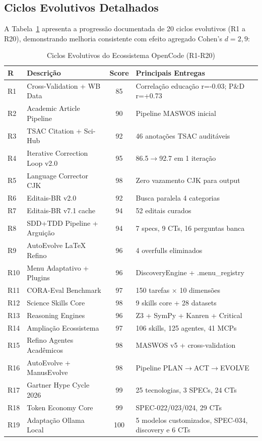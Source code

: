\subsection{Ciclos Evolutivos Detalhados}

A Tabela~\ref{tab:ciclos-evolutivos} apresenta a progressão documentada de 20 ciclos evolutivos (R1 a R20), demonstrando melhoria consistente com efeito agregado Cohen's $d = 2,9$:

\begin{table}[H]
\centering
\caption{Ciclos Evolutivos do Ecossistema OpenCode (R1-R20)}
\label{tab:ciclos-evolutivos}
\begin{tabular}{p{0.6cm}p{3.5cm}cp{5cm}}
\toprule
\textbf{R} & \textbf{Descrição} & \textbf{Score} & \textbf{Principais Entregas} \\
\midrule
R1 & Cross-Validation + WB Data & 85 & Correlação educação r=-0.03; P\&D r=+0.73 \\
R2 & Academic Article Pipeline & 90 & Pipeline MASWOS inicial \\
R3 & TSAC Citation + Sci-Hub & 92 & 46 anotações TSAC auditáveis \\
R4 & Iterative Correction Loop v2.0 & 95 & 86.5$\rightarrow$92.7 em 1 iteração \\
R5 & Language Corrector CJK & 98 & Zero vazamento CJK para output \\
R6 & Editais-BR v2.0 & 92 & Busca paralela 4 categorias \\
R7 & Editais-BR v7.1 cache & 94 & 52 editais curados \\
R8 & SDD+TDD Pipeline + Arguição & 94 & 7 specs, 9 CTs, 16 perguntas banca \\
R9 & AutoEvolve LaTeX Refino & 96 & 4 overfulls eliminados \\
R10 & Menu Adaptativo + Plugins & 96 & DiscoveryEngine + .menu\_registry \\
R11 & CORA-Eval Benchmark & 97 & 150 tarefas $\times$ 10 dimensões \\
R12 & Science Skills Core & 98 & 9 skills core + 28 datasets \\
R13 & Reasoning Engines & 96 & Z3 + SymPy + Kanren + Critical \\
R14 & Ampliação Ecossistema & 97 & 106 skills, 125 agentes, 41 MCPs \\
R15 & Refino Agentes Acadêmicos & 98 & MASWOS v5 + cross-validation \\
R16 & AutoEvolve + ManusEvolve & 98 & Pipeline PLAN$\rightarrow$ACT$\rightarrow$EVOLVE \\
R17 & Gartner Hype Cycle 2026 & 99 & 25 tecnologias, 3 SPECs, 24 CTs \\
R18 & Token Economy Core & 99 & SPEC-022/023/024, 29 CTs \\
R19 & Adaptação Ollama Local & 100 & 5 modelos customizados, SPEC-034, discovery e 6 CTs \\
\bottomrule
\end{tabular}
\end{table}


